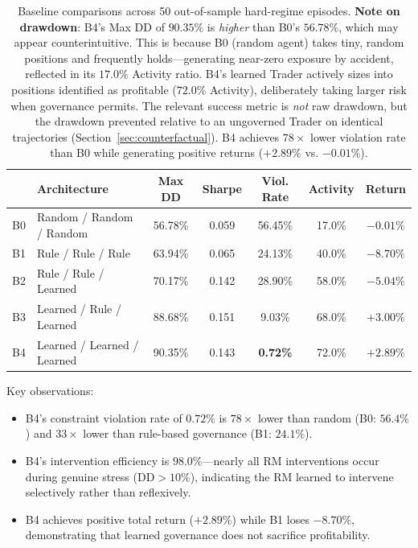 \documentclass[11pt]{article}
\begin{document}
\begin{table}[h]
\centering
\begin{tabular}{@{}llccccc@{}}
\toprule
 & \textbf{Architecture} & \textbf{Max DD} & \textbf{Sharpe} & \textbf{Viol. Rate} & \textbf{Activity} & \textbf{Return} \\ \midrule
B0 & Random / Random / Random       & 56.78\% & 0.059 & 56.45\% & 17.0\% & $-0.01\%$ \\
B1 & Rule / Rule / Rule             & 63.94\% & 0.065 & 24.13\% & 40.0\% & $-8.70\%$ \\
B2 & Rule / Rule / Learned          & 70.17\% & 0.142 & 28.90\% & 58.0\% & $-5.04\%$ \\
B3 & Learned / Rule / Learned       & 88.68\% & 0.151 &  9.03\% & 68.0\% & $+3.00\%$ \\
B4 & Learned / Learned / Learned    & 90.35\% & 0.143 &  \textbf{0.72\%} & 72.0\% & $+2.89\%$ \\ \bottomrule
\end{tabular}
\caption{Baseline comparisons across 50 out-of-sample hard-regime episodes. \textbf{Note on drawdown}: B4's Max DD of $90.35\%$ is \emph{higher} than B0's $56.78\%$, which may appear counterintuitive. This is because B0 (random agent) takes tiny, random positions and frequently holds---generating near-zero exposure by accident, reflected in its $17.0\%$ Activity ratio. B4's learned Trader actively sizes into positions identified as profitable ($72.0\%$ Activity), deliberately taking larger risk when governance permits. The relevant success metric is \emph{not} raw drawdown, but the drawdown prevented relative to an ungoverned Trader on identical trajectories (Section~\ref{sec:counterfactual}). B4 achieves $78\times$ lower violation rate than B0 while generating positive returns ($+2.89\%$ vs. $-0.01\%$).}
\label{tab:baselines}
\end{table}

Key observations:
\begin{itemize}[leftmargin=*]
    \item B4's constraint violation rate of $0.72\%$ is $78\times$ lower than random (B0: $56.4\%$) and $33\times$ lower than rule-based governance (B1: $24.1\%$).
    \item B4's intervention efficiency is $98.0\%$---nearly all RM interventions occur during genuine stress ($\text{DD} > 10\%$), indicating the RM learned to intervene selectively rather than reflexively.
    \item B4 achieves positive total return ($+2.89\%$) while B1 loses $-8.70\%$, demonstrating that learned governance does not sacrifice profitability.
\end{itemize}
\end{document}
